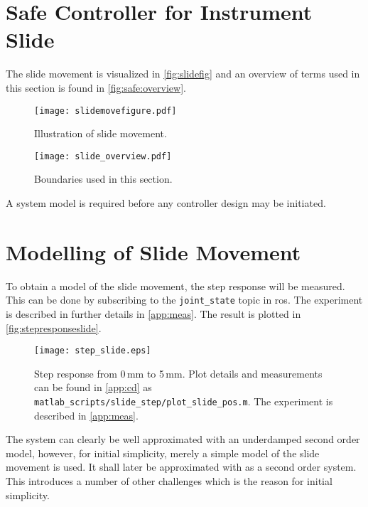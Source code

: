 \section{Safe Controller for Instrument Slide}
The slide movement is visualized in \autoref{fig:slidefig} and an overview of terms used in this section is found in \autoref{fig:safe:overview}.
\begin{figure}[H]
    \centering
    \begin{minipage}{.5\textwidth}
        \centering
        \texttt{[image: slidemovefigure.pdf]}
        \caption{Illustration of slide movement.}
        \label{fig:slidefig}
    \end{minipage}%
    \begin{minipage}{0.5\textwidth}
        \centering
        \texttt{[image: slide\_overview.pdf]}
        \caption{Boundaries used in this section.}
        \label{fig:safe:overview}
    \end{minipage}
\end{figure}
A system model is required before any controller design may be initiated.
\section{Modelling of Slide Movement}
To obtain a model of the slide movement, the step response will be measured.  This can be done by subscribing to the \texttt{joint\_state} topic in \gls{ros}. The experiment is described in further details in \autoref{app:meas}. The result is plotted in \autoref{fig:stepresponseslide}. 
\begin{figure}[H]
\center
\texttt{[image: step\_slide.eps]}
\caption{Step response from 0\,mm to 5\,mm. Plot details and measurements can be found in \autoref{app:cd} as \texttt{matlab\_scripts/slide\_step/plot\_slide\_pos.m}. The experiment is described in \autoref{app:meas}.}
\label{fig:stepresponseslide}
\end{figure}
The system can clearly be well approximated with an underdamped second order model, however, for initial simplicity, merely a simple model of the slide movement is used. It shall later be approximated with as a second order system. This introduces a number of other challenges which is the reason for initial simplicity.
